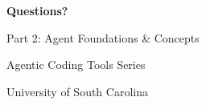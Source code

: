 \documentclass[aspectratio=169, 11pt]{beamer}
\begin{document}
\begin{frame}[plain]
    \begin{center}
        \vspace{2cm}
        {\Huge\textcolor{UofSCGarnet}{\textbf{Questions?}}}

        \vspace{1.5cm}
        {\Large Part 2: Agent Foundations \& Concepts}

        \vspace{0.5cm}
        {\large Agentic Coding Tools Series}

        \vspace{1.5cm}
        {\footnotesize University of South Carolina}
    \end{center}
\end{frame}
\end{document}
